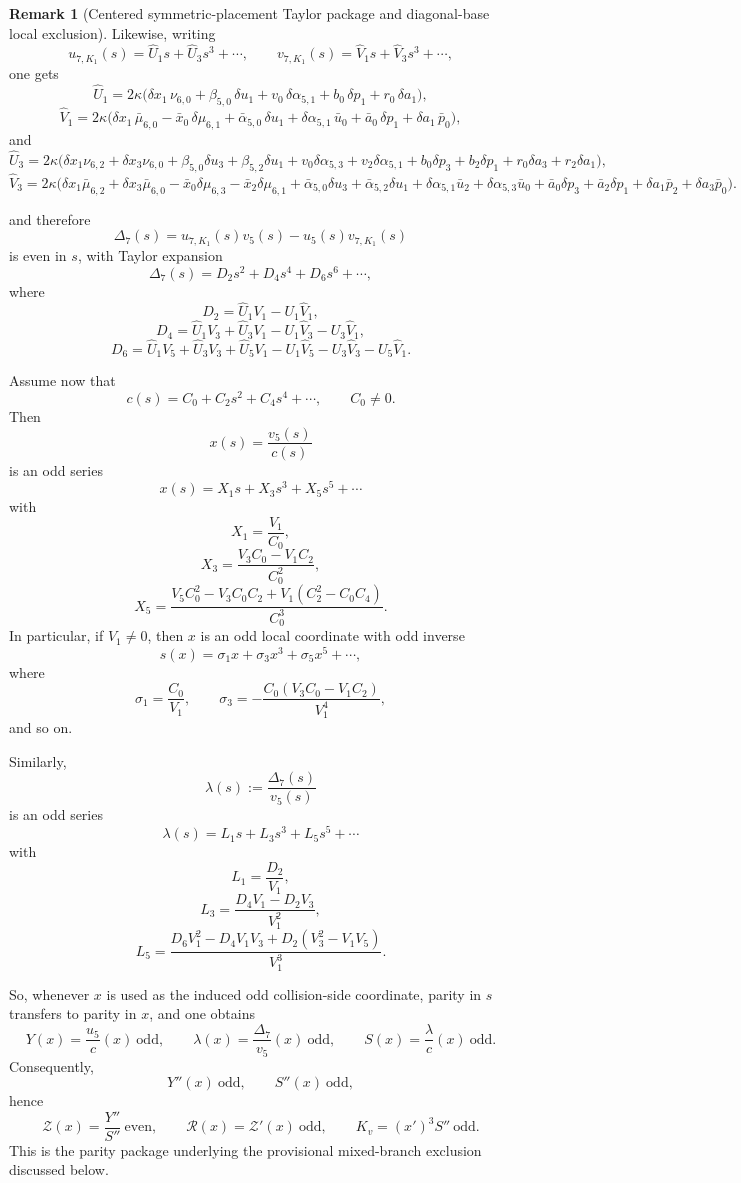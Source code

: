 \documentclass[11pt,a4paper]{amsart}
\theoremstyle{plain}
\theoremstyle{definition}
\newtheorem{remark}[theorem]{Remark}
\begin{document}
\begin{remark}[Centered symmetric-placement Taylor package and diagonal-base local exclusion]
Likewise, writing
\[
u_{7,K_1}(s)=\widehat U_1s+\widehat U_3s^3+\cdots,
\qquad
v_{7,K_1}(s)=\widehat V_1s+\widehat V_3s^3+\cdots,
\]
one gets
\[
\widehat U_1
=
2\kappa\bigl(
\delta x_1\,\nu_{6,0}
+\beta_{5,0}\,\delta u_1
+v_0\,\delta\alpha_{5,1}
+b_0\,\delta p_1
+r_0\,\delta a_1
\bigr),
\]
\[
\widehat V_1
=
2\kappa\bigl(
\delta x_1\,\bar\mu_{6,0}
-\bar x_0\,\delta\mu_{6,1}
+\bar\alpha_{5,0}\,\delta u_1
+\delta\alpha_{5,1}\,\bar u_0
+\bar a_0\,\delta p_1
+\delta a_1\,\bar p_0
\bigr),
\]
and
\[
\widehat U_3
=
2\kappa\bigl(
\delta x_1\nu_{6,2}+\delta x_3\nu_{6,0}
+\beta_{5,0}\delta u_3+\beta_{5,2}\delta u_1
+v_0\delta\alpha_{5,3}+v_2\delta\alpha_{5,1}
+b_0\delta p_3+b_2\delta p_1
+r_0\delta a_3+r_2\delta a_1
\bigr),
\]
\[
\widehat V_3
=
2\kappa\bigl(
\delta x_1\bar\mu_{6,2}+\delta x_3\bar\mu_{6,0}
-\bar x_0\delta\mu_{6,3}-\bar x_2\delta\mu_{6,1}
+\bar\alpha_{5,0}\delta u_3+\bar\alpha_{5,2}\delta u_1
+\delta\alpha_{5,1}\bar u_2+\delta\alpha_{5,3}\bar u_0
+\bar a_0\delta p_3+\bar a_2\delta p_1
+\delta a_1\bar p_2+\delta a_3\bar p_0
\bigr).
\]

and therefore
\[
\Delta_7(s)=u_{7,K_1}(s)v_5(s)-u_5(s)v_{7,K_1}(s)
\]
is even in $s$, with Taylor expansion
\[
\Delta_7(s)=D_2s^2+D_4s^4+D_6s^6+\cdots,
\]
where
\[
D_2=\widehat U_1V_1-U_1\widehat V_1,
\]
\[
D_4=\widehat U_1V_3+\widehat U_3V_1-U_1\widehat V_3-U_3\widehat V_1,
\]
\[
D_6=\widehat U_1V_5+\widehat U_3V_3+\widehat U_5V_1-U_1\widehat V_5-U_3\widehat V_3-U_5\widehat V_1.
\]

\medskip

Assume now that
\[
c(s)=C_0+C_2s^2+C_4s^4+\cdots,
\qquad C_0\neq 0.
\]
Then
\[
x(s)=\frac{v_5(s)}{c(s)}
\]
is an odd series
\[
x(s)=X_1s+X_3s^3+X_5s^5+\cdots
\]
with
\[
X_1=\frac{V_1}{C_0},
\]
\[
X_3=\frac{V_3C_0-V_1C_2}{C_0^2},
\]
\[
X_5=\frac{V_5C_0^2-V_3C_0C_2+V_1(C_2^2-C_0C_4)}{C_0^3}.
\]
In particular, if $V_1\neq 0$, then $x$ is an odd local coordinate with odd
inverse
\[
s(x)=\sigma_1x+\sigma_3x^3+\sigma_5x^5+\cdots,
\]
where
\[
\sigma_1=\frac{C_0}{V_1},
\qquad
\sigma_3=-\frac{C_0(V_3C_0-V_1C_2)}{V_1^4},
\]
and so on.

Similarly,
\[
\lambda(s):=\frac{\Delta_7(s)}{v_5(s)}
\]
is an odd series
\[
\lambda(s)=L_1s+L_3s^3+L_5s^5+\cdots
\]
with
\[
L_1=\frac{D_2}{V_1},
\]
\[
L_3=\frac{D_4V_1-D_2V_3}{V_1^2},
\]
\[
L_5=\frac{D_6V_1^2-D_4V_1V_3+D_2(V_3^2-V_1V_5)}{V_1^3}.
\]

So, whenever $x$ is used as the induced odd collision-side coordinate, parity
in $s$ transfers to parity in $x$, and one obtains
\[
Y(x)=\frac{u_5}{c}(x)\ \text{odd},
\qquad
\lambda(x)=\frac{\Delta_7}{v_5}(x)\ \text{odd},
\qquad
S(x)=\frac{\lambda}{c}(x)\ \text{odd}.
\]
Consequently,
\[
Y''(x)\ \text{odd},\qquad
S''(x)\ \text{odd},
\]
hence
\[
\mathcal Z(x)=\frac{Y''}{S''}\ \text{even},
\qquad
\mathcal R(x)=\mathcal Z'(x)\ \text{odd},
\qquad
K_v=(x')^3S''\ \text{odd}.
\]
This is the parity package underlying the provisional mixed-branch exclusion
discussed below.


\end{remark}
\end{document}
